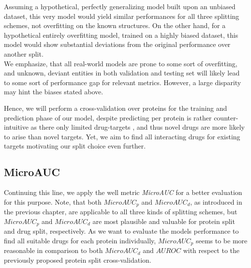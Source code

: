 \documentclass{bioinfo}
\begin{document}
Assuming a hypothetical, perfectly generalizing model built upon an unbiased dataset, this very model would yield similar performances for all three splitting schemes, not overfitting on the known structures. On the other hand, for a hypothetical entirely overfitting model, trained on a highly biased dataset, this model would show substantial deviations from the original performance over another split. \\
We emphasize, that all real-world models are prone to some sort of overfitting, and unknown, deviant entities in both validation and testing set will likely lead to some sort of performance gap for relevant metrics. However, a large disparity may hint the biases stated above.

Hence, we will perform a cross-validation over proteins for the training and prediction phase of our model, despite predicting per protein is rather counter-intuitive as there only limited drug-targets \citep{Overington2006}, and thus novel drugs are more likely to arise than novel targets. Yet, we aim to find all interacting drugs for existing targets motivating our split choice even further.

\subsection{MicroAUC}
Continuing this line, we apply the well metric \textit{MicroAUC} for a better evaluation for this purpose. Note, that both $MicroAUC_p$ and $MicroAUC_d$, as introduced in the previous chapter, are applicable to all three kinds of splitting schemes, but $MicroAUC_p$ and $MicroAUC_d$ are most plausible and valuable for protein split and drug split, respectively. As we want to evaluate the models performance to find all suitable drugs for each protein individually, \textit{$MicroAUC_p$} seems to be more reasonable in comparison to both $MicroAUC_d$ and $AUROC$ with respect to the previously proposed protein split cross-validation. 
\end{document}

